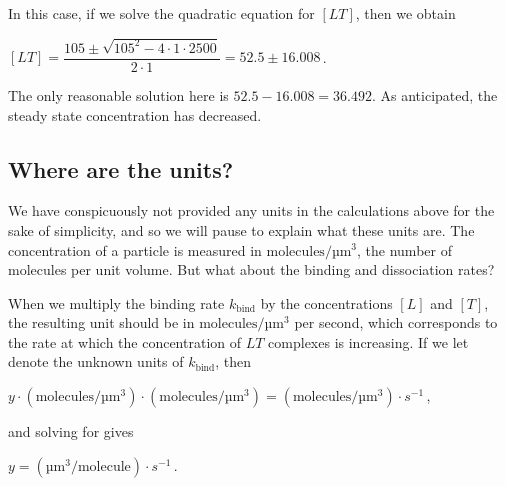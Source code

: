 \noindent In this case, if we solve the quadratic equation for $[LT]$, then we obtain

\begin{center}
$[LT] = \dfrac{105 \pm \sqrt{105^2 - 4 \cdot 1 \cdot 2500}}{2 \cdot 1} = 52.5 \pm 16.008$\,.
\end{center}

\noindent The only reasonable solution here is $52.5-16.008 = 36.492$. As anticipated, the steady state concentration has decreased.\\

\begin{qbox}\end{qbox}

\FloatBarrier
{}
\subsection{Where are the units?}

We have conspicuously not provided any units in the calculations above for the sake of simplicity, and so we will pause to explain what these units are. The concentration of a particle is measured in $\text{molecules}/\text{µm}^3$, the number of molecules per unit volume. But what about the binding and dissociation rates?

When we multiply the binding rate $k_\text{bind}$ by the concentrations $[L]$ and $[T]$, the resulting unit should be in $\text{molecules}/\text{µm}^3$ per second, which corresponds to the rate at which the concentration of $LT$ complexes is increasing. If we let  denote the unknown units of $k_\text{bind}$, then

\begin{center}
$y \cdot (\text{molecules}/\text{µm}^3) \cdot (\text{molecules}/\text{µm}^3) = (\text{molecules}/\text{µm}^3) \cdot s^{-1}$\,,
\end{center}

\noindent and solving for  gives

\begin{center}
$y = (\text{µm}^3/\text{molecule}) \cdot s^{-1}$\,.
\end{center}

